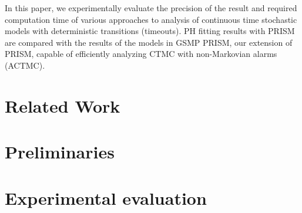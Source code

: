 \documentclass[runningheads,custombib]{llncs}
\begin{document}
	In this paper, we experimentally evaluate the precision of the result and required computation time of various approaches to analysis of continuous time stochastic models with deterministic transitions (timeouts). PH fitting results with PRISM are compared with the results of the models in GSMP PRISM, our extension of PRISM, capable of efficiently analyzing CTMC with non-Markovian alarms (ACTMC).
	
	


\section{Related Work}



\section{Preliminaries}



	\section{Experimental evaluation}
	\label{experimetal_evaluation}
	
\end{document}
